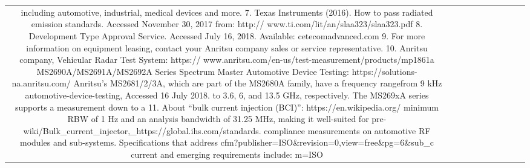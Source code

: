 \begin{table}[h!]
\begin{tabular}{|c|c|c|c|c|c|c|c|c|c|}
                                        including automotive, industrial, medical devices and more.                  7.     Texas Instruments (2016). How to pass radiated emission
                                                                                                                            standards. Accessed November 30, 2017 from: http://
                                                                                                                            www.ti.com/lit/an/slaa323/slaa323.pdf
                                                                                                                     8.     Development Type Approval Service. Accessed July 16, 2018.
                                                                                                                            Available: cetecomadvanced.com
                                                                                                                     9.     For more information on equipment leasing, contact your
                                                                                                                            Anritsu company sales or service representative.
                                                                                                                     10.    Anritsu company, Vehicular Radar Test System: https://
                                                                                                                            www.anritsu.com/en-us/test-measurement/products/mp1861a
  MS2690A/MS2691A/MS2692A Series Spectrum Master                                                                        Automotive Device Testing: https://solutions-na.anritsu.com/
  Anritsu’s MS2681/2/3A, which are part of the MS2680A family, have a frequency rangefrom 9 kHz                          automotive-device-testing, Accessed 16 July 2018.
  to 3.6, 6, and 13.5 GHz, respectively. The MS269xA series supports a measurement down to a                           11.    About “bulk current injection (BCI)”: https://en.wikipedia.org/
  minimum RBW of 1 Hz and an analysis bandwidth of 31.25 MHz, making it well-suited for pre-                               wiki/Bulk_current_injector,_https://global.ihs.com/standards.
  compliance measurements on automotive RF modules and sub-systems. Specifications that address                            cfm?publisher=ISO\&revision=0,view=free\&pg=6\&sub_c
  current and emerging requirements include:                                                                               m=ISO

\end{tabular}
\end{table}
